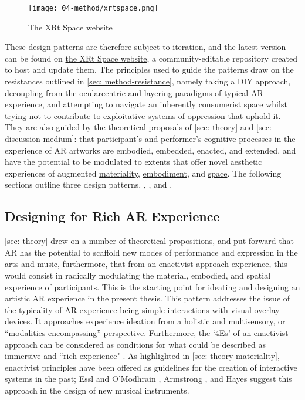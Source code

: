 \begin{figure}
    \centering
    {\texttt{[image: 04-method/xrtspace.png]}}
    \caption[The XRt Space website]{The XRt Space website}
\end{figure}\label{fig: thexrtspace}

These design patterns are therefore subject to iteration, and the latest version can be found on \href{https://www.thexrt.space}{the XRt Space website}, a community-editable repository created to host and update them. The principles used to guide the patterns draw on the resistances outlined in \autoref{sec: method-resistance}, namely taking a DIY approach, decoupling from the ocularcentric and layering paradigms of typical AR experience, and attempting to navigate an inherently consumerist space whilst trying not to contribute to exploitative systems of oppression that uphold it. They are also guided by the theoretical proposals of \autoref{sec: theory} and \autoref{sec: discussion-medium}: that participant's and performer's cognitive processes in the experience of AR artworks are embodied, embedded, enacted, and extended, and have the potential to be modulated to extents that offer novel aesthetic experiences of augmented \hyperref[sec: discussion-medium-material]{materiality}, \hyperref[sec: discussion-medium-embodiment]{embodiment}, and \hyperref[sec: discussion-medium-space]{space}. The following sections outline three design patterns, \textit{}, \textit{}, and \textit{}.

\subsection{Designing for Rich AR Experience} \label{sec: discussion-patterns-experience} 
\autoref{sec: theory} drew on a number of theoretical propositions, and put forward that AR has the potential to scaffold new modes of performance and expression in the arts and music, furthermore, that from an enactivist approach experience, this would consist in radically modulating the material, embodied, and spatial experience of participants. This is the starting point for ideating and designing an artistic AR experience in the present thesis. This pattern addresses the issue of the typicality of AR experience being simple interactions with visual overlay devices. It approaches experience ideation from a holistic and multisensory, or ``modalities-encompassing'' \citep{schraffenberger2018} perspective. Furthermore, the `4Es' of an enactivist approach can be considered as conditions for what could be described as immersive and ``rich experience" \citep{bilbow2021}. As highlighted in \autoref{sec: theory-materiality}, enactivist principles have been offered as guidelines for the creation of interactive systems in the past; Essl and O'Modhrain \citeyearpar{essl2006}, Armstrong \citeyearpar{armstrong2006}, and Hayes \citeyearpar{hayes2019} suggest this approach in the design of new musical instruments. 

